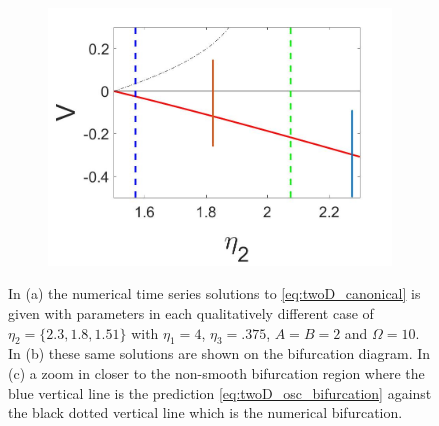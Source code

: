 \begin{figure}[H]
\begin{subfigure}{.5\textwidth}
 \includegraphics[width=\linewidth]{twoD/osc_bif_diagram_zoom.jpg}
 \caption{}
\end{subfigure}
\caption{In (a) the numerical time series solutions to \eqref{eq:twoD_canonical} is given with parameters in each qualitatively different case of $\eta_2=\{2.3,1.8,1.51\}$ with $\eta_1=4$, $\eta_3=.375$, $A=B=2$ and $\Omega = 10$. In (b) these same solutions are shown on the bifurcation diagram. In (c) a zoom in closer to the non-smooth bifurcation region where the blue vertical line is the prediction \eqref{eq:twoD_osc_bifurcation} against the black dotted vertical line which is the numerical bifurcation.}
\label{fig:twoD_osc_Vnumerics}
\end{figure}

